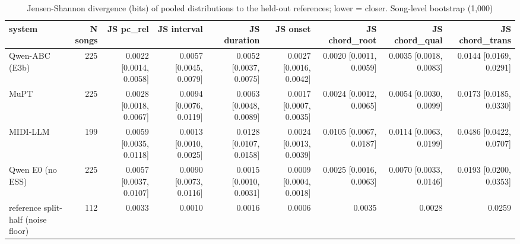 \begin{table}[t]
\centering
\small
\begin{tabular}{lrrrrrrrr}
\toprule
system & N songs & JS pc\_rel & JS interval & JS duration & JS onset & JS chord\_root & JS chord\_qual & JS chord\_trans \\
\midrule
Qwen-ABC (E3b) & 225 & 0.0022 [0.0014, 0.0058] & 0.0057 [0.0045, 0.0079] & 0.0052 [0.0037, 0.0075] & 0.0027 [0.0016, 0.0042] & 0.0020 [0.0011, 0.0059] & 0.0035 [0.0018, 0.0083] & 0.0144 [0.0169, 0.0291] \\
MuPT & 225 & 0.0028 [0.0018, 0.0067] & 0.0094 [0.0076, 0.0119] & 0.0063 [0.0048, 0.0089] & 0.0017 [0.0007, 0.0035] & 0.0024 [0.0012, 0.0065] & 0.0054 [0.0030, 0.0099] & 0.0173 [0.0185, 0.0330] \\
MIDI-LLM & 199 & 0.0059 [0.0035, 0.0118] & 0.0013 [0.0010, 0.0025] & 0.0128 [0.0107, 0.0158] & 0.0024 [0.0013, 0.0039] & 0.0105 [0.0067, 0.0187] & 0.0114 [0.0063, 0.0199] & 0.0486 [0.0422, 0.0707] \\
Qwen E0 (no ESS) & 225 & 0.0057 [0.0037, 0.0107] & 0.0090 [0.0073, 0.0116] & 0.0015 [0.0010, 0.0031] & 0.0009 [0.0004, 0.0018] & 0.0025 [0.0016, 0.0063] & 0.0070 [0.0033, 0.0146] & 0.0193 [0.0200, 0.0353] \\
reference split-half (noise floor) & 112 & 0.0033 & 0.0010 & 0.0016 & 0.0006 & 0.0035 & 0.0028 & 0.0259 \\
\bottomrule
\end{tabular}
\caption{Jensen-Shannon divergence (bits) of pooled distributions to the held-out references; lower = closer. Song-level bootstrap (1,000)}
\label{tab:musicality_js}
\end{table}

